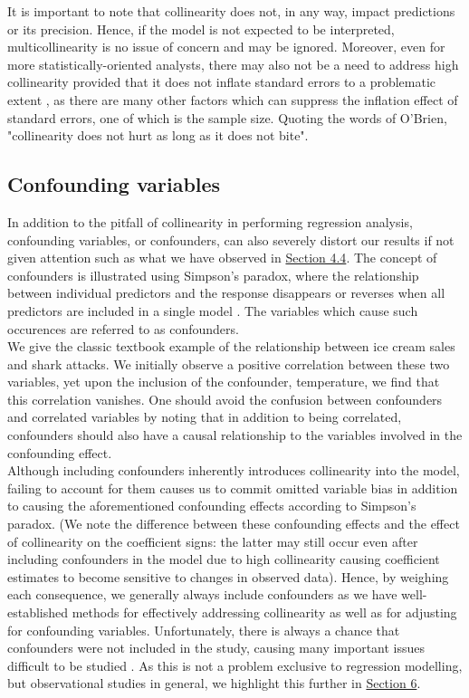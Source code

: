 \documentclass[12pt]{article}
\begin{document}
	It is important to note that collinearity does not, in any way, impact predictions or its precision. Hence, if the model is not expected to be interpreted, multicollinearity is no issue of concern and may be ignored. Moreover, even for more statistically-oriented analysts, there may also not be a need to address high collinearity provided that it does not inflate standard errors to a problematic extent \cite{OBrien2007}, as there are many other factors which can suppress the inflation effect of standard errors, one of which is the sample size. Quoting the words of O'Brien, "collinearity does not hurt as long as it does not bite".\cite{OBrien2007}
	
	\subsection{Confounding variables\label{sec:4.6}}
	
	In addition to the pitfall of collinearity in performing regression analysis, confounding variables, or confounders, can also severely distort our results if not given attention \cite{Johnston2018} such as what we have observed in \hyperref[sec:4.4]{Section 4.4}. The concept of confounders is illustrated using Simpson's paradox, where the relationship between individual predictors and the response disappears or reverses when all predictors are included in a single model \cite{Agresti2015}. The variables which cause such occurences are referred to as confounders.\\
	
	We give the classic textbook example of the relationship between ice cream sales and shark attacks. We initially observe a positive correlation between these two variables, yet upon the inclusion of the confounder, temperature, we find that this correlation vanishes. One should avoid the confusion between confounders and correlated variables by noting that in addition to being correlated, confounders should also have a causal relationship to the variables involved in the confounding effect.\\
	
	Although including confounders inherently introduces collinearity into the model, failing to account for them causes us to commit omitted variable bias in addition to causing the aforementioned confounding effects according to Simpson's paradox. (We note the difference between these confounding effects and the effect of collinearity on the coefficient signs: the latter may still occur even after including confounders in the model due to high collinearity causing coefficient estimates to become sensitive to changes in observed data). Hence, by weighing each consequence, we generally always include confounders as we have well-established methods for effectively addressing collinearity as well as for adjusting for confounding variables. Unfortunately, there is always a chance that confounders were not included in the study, causing many important issues difficult to be studied \cite{Agresti2018}. As this is not a problem exclusive to regression modelling, but observational studies in general, we highlight this further in \hyperref[sec:future-rec]{Section 6}.
	
\end{document}
